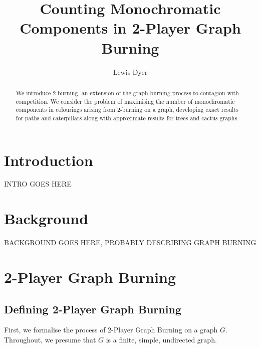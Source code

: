 \documentclass{mpaper}
\begin{document}
\title{Counting Monochromatic Components in 2-Player Graph Burning}
\author{Lewis Dyer}

\maketitle

\begin{abstract}
We introduce 2-burning, an extension of the graph burning process to contagion with competition. We consider the problem of maximising the number of monochromatic components in colourings arising from 2-burning on a graph, developing exact results for paths and caterpillars along with approximate results for trees and cactus graphs.
\end{abstract}

\section{Introduction}
\vspace{1em}

INTRO GOES HERE

\section{Background}
\vspace{1em}

BACKGROUND GOES HERE, PROBABLY DESCRIBING GRAPH BURNING


\section{2-Player Graph Burning}
\vspace{1em}

\subsection{Defining 2-Player Graph Burning}
\vspace{1em}

First, we formalise the process of 2-Player Graph Burning on a graph $G$. Throughout, we presume that $G$ is a finite, simple, undirected graph.
\end{document}
